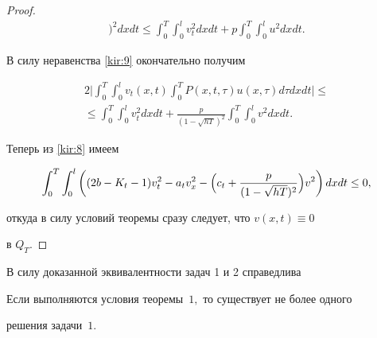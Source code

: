 \begin{proof}
\begin{multline*}
\biggr)^2dxdt \leq

  \int _0^T \int _0^lv_t^2dxdt+p \int _0^T \int _0^lu^2dxdt.

\end{multline*}



В силу неравенства \eqref{kir:9} окончательно получим

\begin{multline}

 \label{kir:10}

2\biggl| \int _0^T \int _0^lv_t(x,t) \int _0^TP(x,t,\tau)u(x,\tau)d\tau

dxdt\biggr|\leq\\

\leq

 \int _0^T \int _0^lv_t^2dxdt+\frac{p}{(1-\sqrt{hT})^2} \int _0^T \int _0^lv^2dxdt.

\end{multline}

Теперь из \eqref{kir:8} имеем

$$

 \int _0^T \int _0^l\left((2b-K_t-1)v_t^2-a_tv_x^2-\Bigl(c_t+\frac{p}{(1-\sqrt{hT})^2}\Bigr)v^2\right)dxdt\leq

0,

$$

откуда в силу условий теоремы сразу следует, что $v(x,t)\equiv 0$

в $Q_T$.

\end{proof}



\smallskip



В силу доказанной эквивалентности задач 1 и 2 справедлива



\smallskip



\begin{theorem}[2]Если выполняются условия теоремы~$1,$ то существует не более одного

решения задачи~$1.$

\end{theorem}





